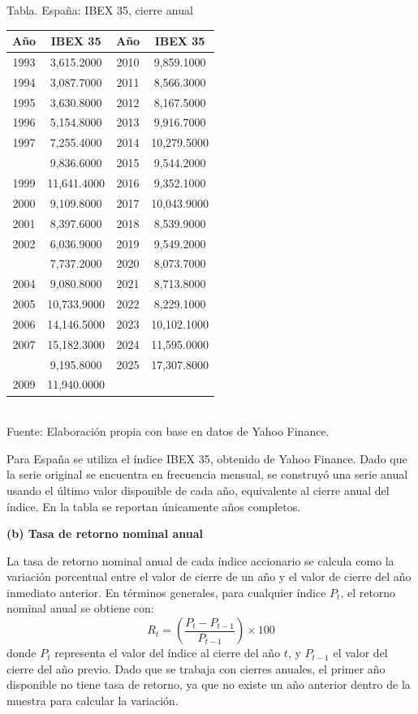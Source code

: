 \documentclass{article}\usepackage[]{graphicx}\usepackage[]{xcolor}
\begin{document}
\begin{center}
Tabla. España: IBEX 35, cierre anual
\end{center}
\begin{center}

\begin{tabular}{cccc}
\toprule
Año & IBEX 35 & Año & IBEX 35\\
\midrule
1993 & 3,615.2000 & 2010 & 9,859.1000\\
1994 & 3,087.7000 & 2011 & 8,566.3000\\
1995 & 3,630.8000 & 2012 & 8,167.5000\\
1996 & 5,154.8000 & 2013 & 9,916.7000\\
1997 & 7,255.4000 & 2014 & 10,279.5000\\
\addlinespace
1998 & 9,836.6000 & 2015 & 9,544.2000\\
1999 & 11,641.4000 & 2016 & 9,352.1000\\
2000 & 9,109.8000 & 2017 & 10,043.9000\\
2001 & 8,397.6000 & 2018 & 8,539.9000\\
2002 & 6,036.9000 & 2019 & 9,549.2000\\
\addlinespace
2003 & 7,737.2000 & 2020 & 8,073.7000\\
2004 & 9,080.8000 & 2021 & 8,713.8000\\
2005 & 10,733.9000 & 2022 & 8,229.1000\\
2006 & 14,146.5000 & 2023 & 10,102.1000\\
2007 & 15,182.3000 & 2024 & 11,595.0000\\
\addlinespace
2008 & 9,195.8000 & 2025 & 17,307.8000\\
2009 & 11,940.0000 &  & \\
\bottomrule
\end{tabular}
\\[0.3em]
{\footnotesize Fuente: Elaboración propia con base en datos de Yahoo Finance.}
\end{center}


Para España se utiliza el índice IBEX 35, obtenido de Yahoo Finance. Dado que la serie original se encuentra en frecuencia mensual, se construyó una serie anual usando el último valor disponible de cada año, equivalente al cierre anual del índice. En la tabla se reportan únicamente años completos.

\newpage
\textbf{(b) Tasa de retorno nominal anual}

La tasa de retorno nominal anual de cada índice accionario se calcula como la variación porcentual entre el valor de cierre de un año y el valor de cierre del año inmediato anterior. En términos generales, para cualquier índice \(P_t\), el retorno nominal anual se obtiene con:
\[
R_t=\left(\frac{P_t-P_{t-1}}{P_{t-1}}\right)\times 100
\]
donde \(P_t\) representa el valor del índice al cierre del año \(t\), y \(P_{t-1}\) el valor del cierre del año previo. Dado que se trabaja con cierres anuales, el primer año disponible no tiene tasa de retorno, ya que no existe un año anterior dentro de la muestra para calcular la variación.
\end{document}
